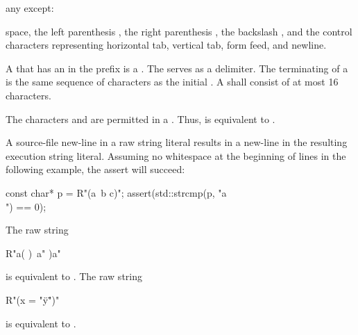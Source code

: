 \documentclass{wg21}
\begin{document}
\begin{bnf}
    \br
    \textnormal{any  except:}\br

    \textnormal{space, the left parenthesis \terminal{(}, the right parenthesis \terminal{)}, the backslash \terminal{\textbackslash}, and the control characters}\br
    \bnfindent\textnormal{representing horizontal tab, vertical tab, form feed, and newline.}
\end{bnf}

\pnum
{}%
A  that has an 
%
in the prefix is a . The
 serves as a delimiter. The terminating
 of a  is the same sequence of
characters as the initial . A 
shall consist of at most 16 characters.

\pnum
\begin{note}
    The characters  and  are permitted in a
    . Thus,  is equivalent to
    .
\end{note}

\pnum
\begin{note}
    A source-file new-line in a raw string literal results in a new-line in the
    resulting execution string literal. Assuming no
    whitespace at the beginning of lines in the following example, the assert will succeed:
    \begin{codeblock}
        const char* p = R"(a\
        b
        c)";
        assert(std::strcmp(p, "a\\\nb\nc") == 0);
    \end{codeblock}
\end{note}

\pnum
\begin{example}
    The raw string
    \begin{codeblock}
        R"a(
        )\
        a"
        )a"
    \end{codeblock}
    is equivalent to . The raw string
    \begin{codeblock}
        R"(x = "\"y\"")"
    \end{codeblock}
    is equivalent to .
\end{example}
\end{document}
